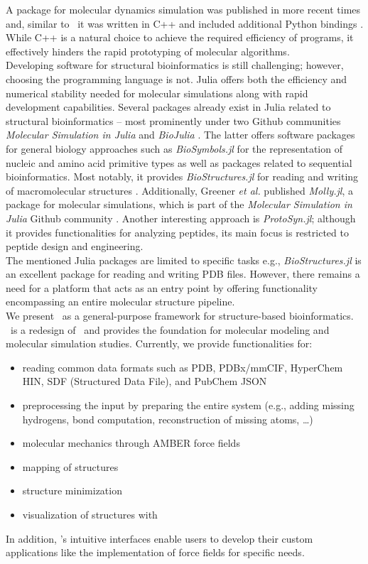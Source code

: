 A package for molecular dynamics simulation was published in more recent times and, similar to \ball\, it was written in C++ and included additional Python bindings \cite{Doerr2016HTMD}. While C++ is a natural choice to achieve the required efficiency of programs, it effectively hinders the rapid prototyping of molecular algorithms.  \\
Developing software for structural bioinformatics is still challenging; however, choosing the programming language is not. Julia offers both the efficiency and numerical stability needed for molecular simulations along with rapid development capabilities. Several packages already exist in Julia related to structural bioinformatics -- most prominently under two Github communities \textit{Molecular Simulation in Julia} and \textit{BioJulia} \cite{JuliaMolSim, BioJulia}. The latter offers software packages for general biology approaches such as \textit{BioSymbols.jl} for the representation of nucleic and amino acid primitive types as well as packages related to sequential bioinformatics. Most notably, it provides \textit{BioStructures.jl} for reading and writing of macromolecular structures \cite{Greener2020BioStructures}. Additionally, Greener \textit{et al.} published \textit{Molly.jl}, a package for molecular simulations, which is part of the \textit{Molecular Simulation in Julia} Github community \cite{Greener2024}.
Another interesting approach is \textit{ProtoSyn.jl}; although it provides functionalities for analyzing peptides, its main focus is restricted to peptide design and engineering. \\
The mentioned Julia packages are limited to specific tasks e.g., \textit{BioStructures.jl} is an excellent package for reading and writing PDB files. However, there remains a need for a platform that acts as an entry point by offering functionality encompassing an entire molecular structure pipeline.\\
We present \biochem\ as a general-purpose framework for structure-based bioinformatics. \biochem\ is a redesign of \ball\ and provides the foundation for molecular modeling and molecular simulation studies. Currently, we provide functionalities for:
\begin{itemize}
	\item reading common data formats such as PDB, PDBx/mmCIF, HyperChem HIN, SDF (Structured Data File), and PubChem JSON
	\item preprocessing the input by preparing the entire system (e.g., adding missing hydrogens, bond computation, reconstruction of missing atoms, \dots)
	\item molecular mechanics through AMBER force fields 
	\item mapping of structures
	\item structure minimization
	\item visualization of structures with \bioviz
\end{itemize}
In addition, \biochem's intuitive interfaces enable users to develop their custom applications like the implementation of force fields for specific needs. \\

